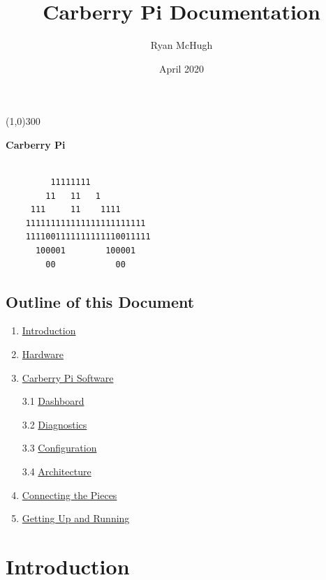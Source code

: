 \documentclass{article}
\title{Carberry Pi Documentation}
\author{Ryan McHugh}
\date{April 2020}
\numberwithin{figure}{section}
\begin{document}
\maketitle


\begin{center}
\line(1,0){300}
\end{center}


\setcounter{secnumdepth}{2}


\textbf{Carberry Pi}

\begin{verbatim}

         11111111
        11   11   1
     111     11    1111
    111111111111111111111111
    1111001111111111110011111
      100001        100001
        00            00
\end{verbatim}

\hypertarget{outline-of-this-document}{%
\subsection{Outline of this Document}\label{outline-of-this-document}}

\begin{enumerate}
\def\labelenumi{\arabic{enumi}.}
\item
  \protect\hyperlink{introduction}{Introduction}
\item
  \protect\hyperlink{hardware}{Hardware}
\item
  \protect\hyperlink{software}{Carberry Pi Software}

  3.1 \protect\hyperlink{dashboard}{Dashboard}

  3.2 \protect\hyperlink{diagnostics}{Diagnostics}

  3.3 \protect\hyperlink{configuration}{Configuration}

  3.4 \protect\hyperlink{architecture}{Architecture}

\item
  \protect\hyperlink{connecting-the-pieces}{Connecting the Pieces}
\item
  \protect\hyperlink{getting-up-and-running}{Getting Up and Running}
\end{enumerate}

\hypertarget{introduction}{%
\section{Introduction}\label{introduction}}
\end{document}
